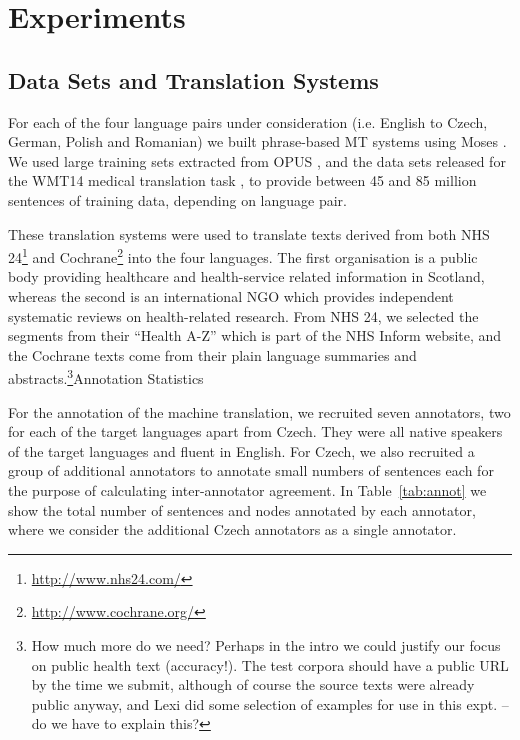\documentclass[11pt]{article}
\newcommand{\tabref}[1]{Table~\ref{#1}}
\newcommand{\bh}[2]{\footnote{\color{blue} #1}}
\begin{document}
\section{Experiments}\label{sec:experiments}
\subsection{Data Sets and Translation Systems}

For each of the four language pairs under consideration (i.e. English to 
Czech, German, Polish and Romanian) we built phrase-based MT systems
using Moses \cite{Koehn:2007}. We used large training sets extracted from OPUS \cite{tiedemann:2009}, and
the data sets released for the WMT14 medical translation task \cite{bojar-EtAl:2014:W14-33}, to provide between
45 and 85 million sentences of training data, depending on language pair.

These translation systems were used to translate texts derived from both NHS 24\footnote{\url{http://www.nhs24.com/}} and 
Cochrane\footnote{\url{http://www.cochrane.org/}} into the four languages. The first organisation is a public body
providing healthcare and health-service related information in Scotland, whereas the second is an international NGO which 
provides independent systematic reviews on health-related research. From NHS 24, we selected the segments from their
``Health A-Z'' which is part of the NHS Inform website, and the Cochrane texts come from their plain language summaries
and abstracts.\bh{How much more do we need? Perhaps in the intro we could justify our focus on public health text
(accuracy!). The test corpora should have a public URL by the time we submit, although of course the source texts were 
already public anyway, and Lexi did some selection of examples for use in this expt. -- do we have to explain this?}

\subsection{Annotation Statistics}

For the annotation of the machine translation, we recruited seven annotators, two for each of the target languages apart from Czech. They were
all native speakers of the target languages and fluent in English. For Czech, we also recruited a  group of additional annotators
to annotate small numbers of sentences each for the purpose of calculating inter-annotator agreement. In \tabref{tab:annot}
we show the total number of sentences and nodes annotated by each annotator, where we consider the additional Czech
annotators as a single annotator.
\end{document}
